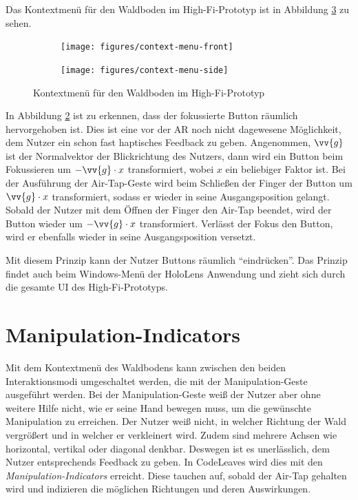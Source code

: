 Das Kontextmenü für den Waldboden im High-Fi-Prototyp ist in Abbildung \ref{fig:context-menu} zu sehen.

\begin{figure}[htb]
  \centering
  \begin{subfigure}[b]{\fwidth}
    \centering
    \texttt{[image: figures/context-menu-front]}
     \label{fig:context-menu-front}
  \end{subfigure}
  \begin{subfigure}[b]{\fwidth}
    \centering
  	\texttt{[image: figures/context-menu-side]}
  	 \label{fig:context-menu-side}
  \end{subfigure}
  \caption{Kontextmenü für den Waldboden im High-Fi-Prototyp} \label{fig:context-menu}
\end{figure}

In Abbildung \ref{fig:context-menu-side} ist zu erkennen, dass der fokussierte Button räumlich hervorgehoben ist. Dies ist eine vor der AR noch nicht dagewesene Möglichkeit, dem Nutzer ein schon fast haptisches Feedback zu geben. Angenommen, $\vv{g}$ ist der Normalvektor der Blickrichtung des Nutzers, dann wird ein Button beim Fokussieren um $-\vv{g} \cdot x$ transformiert, wobei $x$ ein beliebiger Faktor ist. Bei der Ausführung der Air-Tap-Geste wird beim Schließen der Finger der Button um $\vv{g} \cdot x$ transformiert, sodass er wieder in seine Ausgangsposition gelangt. Sobald der Nutzer mit dem Öffnen der Finger den Air-Tap beendet, wird der Button wieder um $-\vv{g} \cdot x$ transformiert. Verlässt der Fokus den Button, wird er ebenfalls wieder in seine Ausgangsposition versetzt.

Mit diesem Prinzip kann der Nutzer Buttons räumlich "`eindrücken"'. Das Prinzip findet auch beim Windows-Menü der HoloLens Anwendung und zieht sich durch die gesamte UI des High-Fi-Prototyps.

\section{Manipulation-Indicators}
\label{subsec:manipulation-indicators}
Mit dem Kontextmenü des Waldbodens kann zwischen den beiden Interaktionsmodi umgeschaltet werden, die mit der Manipulation-Geste ausgeführt werden. Bei der Manipulation-Geste weiß der Nutzer aber ohne weitere Hilfe nicht, wie er seine Hand bewegen muss, um die gewünschte Manipulation zu erreichen. Der Nutzer weiß nicht, in welcher Richtung der Wald vergrößert und in welcher er verkleinert wird. Zudem sind mehrere Achsen wie horizontal, vertikal oder diagonal denkbar. Deswegen ist es unerlässlich, dem Nutzer entsprechends Feedback zu geben. In CodeLeaves wird dies mit den \textit{Manipulation-Indicators} erreicht. Diese tauchen auf, sobald der Air-Tap gehalten wird und indizieren die möglichen Richtungen und deren Auswirkungen.

